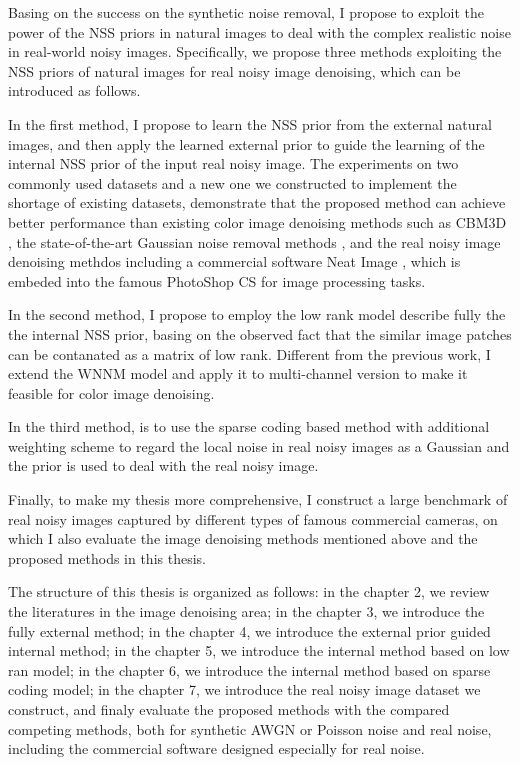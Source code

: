Basing on the success on the synthetic noise removal, I propose to exploit the power of the NSS priors in natural images to deal with the complex realistic noise in real-world noisy images. Specifically, we propose three methods exploiting the NSS priors of natural images for real noisy image denoising, which can be introduced as follows.

In the first method, I propose to learn the NSS prior from the external natural images, and then apply the learned external prior to guide the learning of the internal NSS prior of the input real noisy image. The experiments on two commonly used datasets and a new one we constructed to implement the shortage of existing datasets, demonstrate that the proposed method can achieve better performance than existing color image denoising methods such as CBM3D \cite{cbm3d}, the state-of-the-art Gaussian noise removal methods \cite{bm3d,mlp,csr}, and the real noisy image denoising methdos \cite{} including a commercial software Neat Image \cite{neatimage}, which is embeded into the famous PhotoShop CS for image processing tasks.


In the second method, I propose to employ the low rank model describe fully the the internal NSS prior, basing on the observed fact that the similar image patches can be contanated as a matrix of low rank. Different from the previous work, I extend the WNNM model and apply it to multi-channel version to make it feasible for color image denoising. 

In the third method,  is to use the sparse coding based method with additional weighting scheme to regard the local noise in real noisy images as a Gaussian and the prior is used to deal with the real noisy image.

Finally, to make my thesis more comprehensive, I construct a large benchmark of real noisy images captured by different types of famous commercial cameras, on which I also evaluate the image denoising methods mentioned above and the proposed methods in this thesis. 




The structure of this thesis is organized as follows: in the chapter 2, we review the literatures in the image denoising area; in the chapter 3, we introduce the fully external method; in the chapter 4, we introduce the external prior guided internal method; in the chapter 5, we introduce the internal method based on low ran model; in the chapter 6, we introduce the internal method based on sparse coding model; in the chapter 7, we introduce the real noisy image dataset we construct, and finaly evaluate the proposed methods with the compared competing methods, both for synthetic AWGN or Poisson noise and real noise, including the commercial software designed especially for real noise. 


